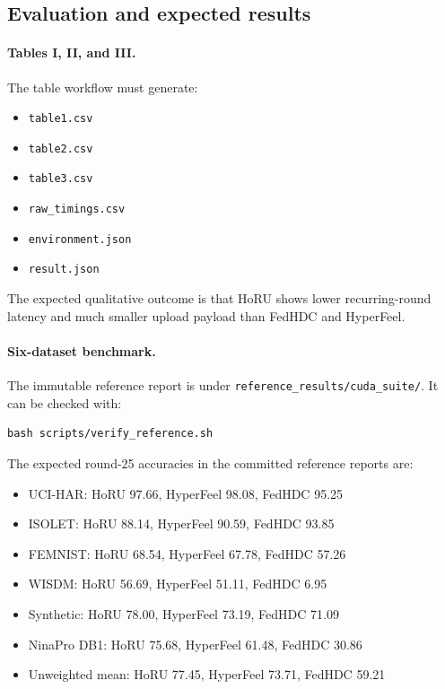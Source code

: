 \documentclass[11pt]{article}
\begin{document}
\subsection{Evaluation and expected results}

\paragraph{Tables I, II, and III.}
The table workflow must generate:
\begin{itemize}
  \item \texttt{table1.csv}
  \item \texttt{table2.csv}
  \item \texttt{table3.csv}
  \item \texttt{raw\_timings.csv}
  \item \texttt{environment.json}
  \item \texttt{result.json}
\end{itemize}
The expected qualitative outcome is that HoRU shows lower recurring-round
latency and much smaller upload payload than FedHDC and HyperFeel.

\paragraph{Six-dataset benchmark.}
The immutable reference report is under
\texttt{reference\_results/cuda\_suite/}. It can be checked with:

\begin{verbatim}
bash scripts/verify_reference.sh
\end{verbatim}

The expected round-25 accuracies in the committed reference reports are:
\begin{itemize}
  \item UCI-HAR: HoRU 97.66, HyperFeel 98.08, FedHDC 95.25
  \item ISOLET: HoRU 88.14, HyperFeel 90.59, FedHDC 93.85
  \item FEMNIST: HoRU 68.54, HyperFeel 67.78, FedHDC 57.26
  \item WISDM: HoRU 56.69, HyperFeel 51.11, FedHDC 6.95
  \item Synthetic: HoRU 78.00, HyperFeel 73.19, FedHDC 71.09
  \item NinaPro DB1: HoRU 75.68, HyperFeel 61.48, FedHDC 30.86
  \item Unweighted mean: HoRU 77.45, HyperFeel 73.71, FedHDC 59.21
\end{itemize}
\end{document}
